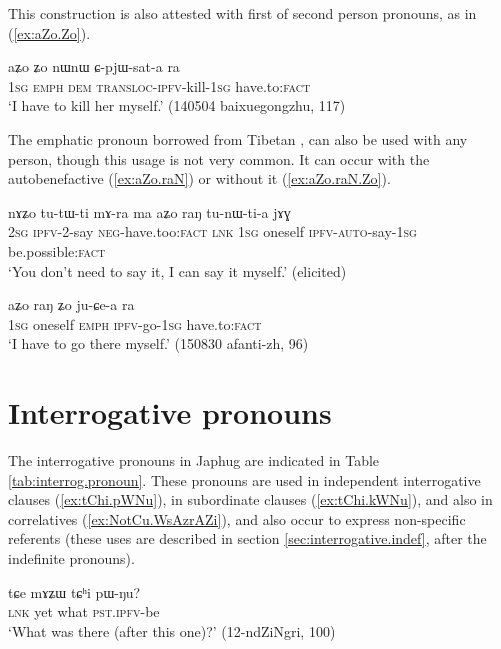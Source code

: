This construction is also attested with first of second person pronouns, as in (\ref{ex:aZo.Zo}).

\begin{exe}
\ex \label{ex:aZo.Zo}
\gll aʑo ʑo nɯnɯ ɕ-pjɯ-sat-a ra \\
\textsc{1sg} \textsc{emph} \textsc{dem} \textsc{transloc-ipfv}-kill-\textsc{1sg} have.to:\textsc{fact} \\
\glt `I have to kill her myself.' (140504 baixuegongzhu, 117)
\end{exe}

The emphatic pronoun  borrowed from Tibetan , can also be used with any person, though this usage is not very common. It can occur with the autobenefactive (\ref{ex:aZo.raN}) or without it (\ref{ex:aZo.raN.Zo}).

\begin{exe}
\ex \label{ex:aZo.raN}
\gll
nɤʑo tu-tɯ-ti mɤ-ra ma aʑo raŋ tu-nɯ-ti-a jɤɣ \\
\textsc{2sg} \textsc{ipfv}-2-say \textsc{neg}-have.too:\textsc{fact} \textsc{lnk} \textsc{1sg} oneself \textsc{ipfv}-\textsc{auto}-say-\textsc{1sg} be.possible:\textsc{fact} \\
\glt `You don't need to say it, I can say it myself.' (elicited)
\end{exe}

\begin{exe}
\ex \label{ex:aZo.raN.Zo}
\gll aʑo raŋ ʑo ju-ɕe-a ra \\
\textsc{1sg} oneself \textsc{emph} \textsc{ipfv}-go-\textsc{1sg} have.to:\textsc{fact} \\
\glt `I have to go there myself.' (150830 afanti-zh, 96)
\end{exe}
\section{Interrogative pronouns}
The interrogative pronouns in Japhug are indicated in Table \ref{tab:interrog.pronoun}. These pronouns are used in independent interrogative clauses (\ref{ex:tChi.pWNu}), in subordinate clauses (\ref{ex:tChi.kWNu}), and also in correlatives (\ref{ex:NotCu.WsAzrAZi}), and also occur to express non-specific referents (these uses are described in section  \ref{sec:interrogative.indef}, after the indefinite pronouns).

\begin{exe}
\ex \label{ex:tChi.pWNu}
\gll
tɕe mɤʑɯ tɕʰi pɯ-ŋu? \\
\textsc{lnk} yet what \textsc{pst.ipfv}-be \\
\glt `What was there (after this one)?' (12-ndZiNgri, 100)
\end{exe}  

